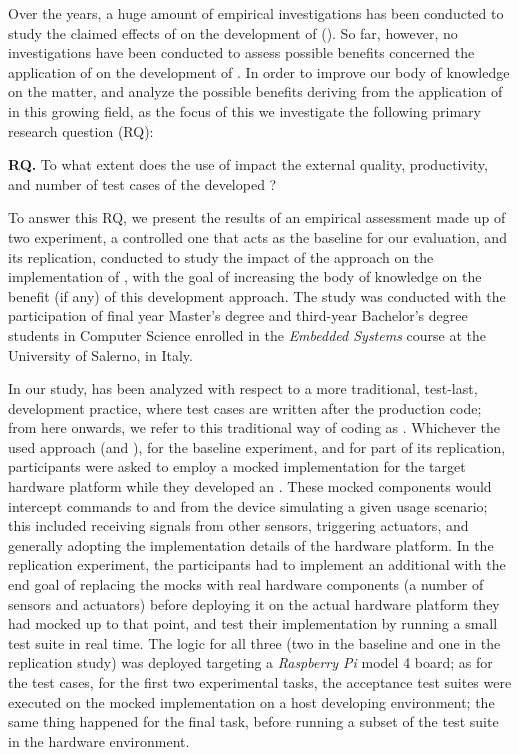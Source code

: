 Over the years, a huge amount of empirical investigations has been conducted to study the claimed effects of \tdd on the development of \noess (\eg \cite{DBLP:journals/software/KaracT18}). So far, however, no investigations have been conducted to assess possible benefits concerned the application of \tdd on the development of \ess. In order to improve our body of knowledge on the matter, and analyze the possible benefits deriving from the application of \tdd in this growing field, as the focus of this we investigate the following primary research question (RQ):

\begin{framed}
\noindent \textbf{RQ.} To what extent does the use of \tdd impact the external quality, productivity, and number of test cases of the developed \es?	
\end{framed}

To answer this RQ, we present the results of an empirical assessment made up of two experiment, a controlled one that acts as the baseline for our evaluation, and its replication, conducted to study the impact of the \tdd approach on the implementation of \ess, with the goal of increasing the body of knowledge on the benefit (if any) of this development approach.
The study was conducted with the participation of final year Master's degree and third-year Bachelor's degree students in Computer Science enrolled in the \textit{Embedded Systems} course at the University of Salerno, in Italy. 

In our study, \tdd has been analyzed with respect to a more traditional, test-last, development practice, where test cases are written after the production code; from here onwards, we refer to this traditional way of coding as \notdd. 
Whichever the used approach (\tdd and \notdd), for the baseline experiment, and for part of its replication, participants were asked to employ a mocked implementation for the target hardware platform while they developed an \es. 
These mocked components would intercept commands to and from the device simulating a given usage scenario; this included receiving signals from other sensors, triggering actuators, and generally adopting the implementation details of the hardware platform.
In the replication experiment, the participants had to implement an additional \es with the end goal of replacing the mocks with real hardware components (a number of sensors and actuators) before deploying it on the actual hardware platform they had mocked up to that point, and test their implementation by running a small test suite in real time. 
The logic for all three \ess (two in the baseline and one in the replication study) was deployed targeting a \textit{Raspberry Pi} model 4 board; as for the test cases, for the first two experimental tasks, the acceptance test suites were executed on the mocked implementation on a host developing environment; the same thing happened for the final task, before running a subset of the test suite in the hardware environment. 

